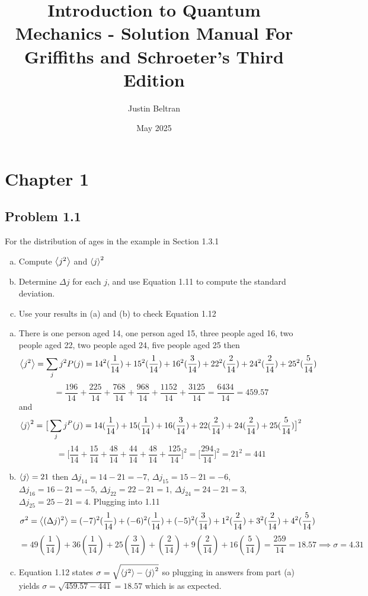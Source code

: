 \documentclass[12pt]{exam}
\title{Introduction to Quantum Mechanics - Solution Manual \newline \small{For Griffiths and Schroeter's Third Edition}}
\author{Justin Beltran}
\date{May 2025}
\begin{document}
\maketitle
{}
\printanswers

\section{Chapter 1}



\subsection*{Problem 1.1}
For the distribution of ages in the example in Section 1.3.1
\begin{enumerate}[(a)]
    \item  Compute $\expval{j^2}$ and $\expval{j}^2$

    \item Determine $\Delta j$ for each $j$, and use Equation 1.11 to compute the standard deviation.

    \item Use your results in (a) and (b) to check Equation 1.12
\end{enumerate}

\begin{solution}
    \begin{enumerate}[(a)]
        \item There is one person aged 14, one person aged 15, three people aged 16, two people aged 22, two people aged 24, five people aged 25 then 
        $$\expval{j^2} = \sum_j j^2 P(j) = 14^2(\frac{1}{14}) + 15^2(\frac{1}{14}) + 16^2(\frac{3}{14})+ 22^2(\frac{2}{14})+ 24^2(\frac{2}{14})+ 25^2(\frac{5}{14})$$
        $$= \frac{196}{14} + \frac{225}{14}+ \frac{768}{14}+ \frac{968}{14}+ \frac{1152}{14}+ \frac{3125}{14} = \frac{6434}{14} = 459.57$$
        and 
        $$\expval{j}^2 =  \big[\sum_j j^ P(j) = 14(\frac{1}{14}) + 15(\frac{1}{14}) + 16(\frac{3}{14})+ 22(\frac{2}{14})+ 24(\frac{2}{14})+ 25(\frac{5}{14})\big]^2$$
        $$= \big[ \frac{14}{14}+ \frac{15}{14} + \frac{48}{14} + \frac{44}{14} + \frac{48}{14} + \frac{125}{14}\big]^2 = \big[\frac{294}{14}\big]^2 = 21^2 = 441$$

        \item $\expval{j}=21$ then $\Delta j_{14} = 14-21 = -7$, $\Delta j_{15} = 15-21 = -6$, $\Delta j_{16} = 16-21 = -5$,  $\Delta j_{22} = 22-21 = 1$, $\Delta j_{24} = 24-21 = 3$, $\Delta j_{25} = 25-21 = 4$.  Plugging into 1.11 $$\sigma^2 = \expval{(\Delta j)^2}  = (-7)^2(\frac{1}{14}) + (-6)^2(\frac{1}{14}) + (-5)^2(\frac{3}{14})+ 1^2(\frac{2}{14})+ 3^2(\frac{2}{14})+ 4^2(\frac{5}{14})$$ 
        $$
        = 49(\frac{1}{14}) + 36(\frac{1}{14}) + 25(\frac{3}{14})+ (\frac{2}{14})+ 9(\frac{2}{14})+ 16(\frac{5}{14})= \frac{259}{14} = 18.57 \implies\sigma = 4.31$$

        \item Equation 1.12 states $\sigma = \sqrt{\expval{j^2}-\expval{j}^2}$ so plugging in answers from part (a) yields $\sigma =\sqrt{459.57-441} = 18.57$ which is as expected.
    \end{enumerate}
\end{solution}
\end{document}
